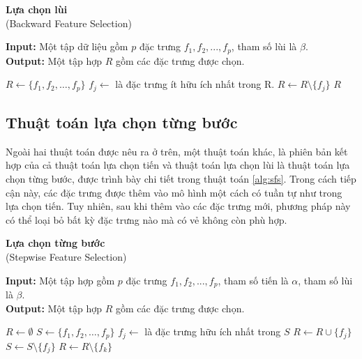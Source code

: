 \begin{breakablealgorithm}
	\caption{\textbf{Lựa chọn lùi}\\
		(Backward Feature Selection)}\label{alg:bfs}
	\noindent\textbf{Input:} Một tập dữ liệu gồm $p$ đặc trưng $f_1,f_2,...,f_p$, tham số lùi là $\beta$.\\
	\textbf{Output:} Một tập hợp $R$ gồm các đặc trưng được chọn.
	\begin{algorithmic}[1]
		\State $R \gets \{f_1, f_2,\ldots, f_p\}$
		\State $f_j \gets$ là đặc trưng ít hữu ích nhất trong R.
		\State $R \gets R\setminus \{f_j\}$
		\Else 
		\State \Return $R$
		\EndIf
		\EndWhile
	\end{algorithmic}
\end{breakablealgorithm} 

\subsection{Thuật toán lựa chọn từng bước}
Ngoài hai thuật toán được nêu ra ở trên, một thuật toán khác, là phiên bản kết hợp của cả thuật toán lựa chọn tiến và thuật toán lựa chọn lùi là thuật toán lựa chọn từng bước, được trình bày chi tiết trong thuật toán \ref{alg:sfs}. Trong cách tiếp cận này, các đặc trưng được thêm vào mô hình một cách có tuần tự như trong lựa chọn tiến. Tuy nhiên, sau khi thêm vào các đặc trưng mới, phương pháp này có thể loại bỏ bất kỳ đặc trưng nào mà có vẻ không còn phù hợp.

\begin{breakablealgorithm}
	\caption{\textbf{Lựa chọn từng bước}\\
		(Stepwise Feature Selection)}\label{alg:sfs}
	\noindent\textbf{Input:} Một tập hợp gồm $p$ đặc trưng $f_1,f_2,...,f_p$, tham số tiến là $\alpha$, tham số lùi là $\beta$.\\
	\textbf{Output:} Một tập hợp $R$ gồm các đặc trưng được chọn.
	\begin{algorithmic}[1]
		\State $R \gets \emptyset$
		\State $S \gets \{f_1, f_2,\ldots, f_p\}$
		\State $f_j \gets$ là đặc trưng hữu ích nhất trong $S$
		\State $R \gets R \cup \{f_j\}$
		\State $S \gets S\setminus \{f_j\}$
		\State $R \gets R\setminus \{f_k\}$
		\EndIf
		\EndWhile\;
		\Else 
		\EndIf
		\EndWhile
	\end{algorithmic}
\end{breakablealgorithm}

